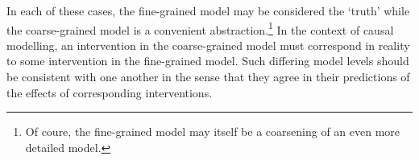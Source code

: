 In each of these cases, the fine-grained model may be considered the `truth' while the coarse-grained model is a convenient abstraction.\footnote{Of coure, the fine-grained model may itself be a coarsening of an even more detailed model.} 
In the context of causal modelling, an intervention in the coarse-grained model must correspond in reality to some intervention in the fine-grained model.
Such differing model levels should be consistent with one another in the sense that they agree in their predictions of the effects of corresponding interventions. 


%
%


